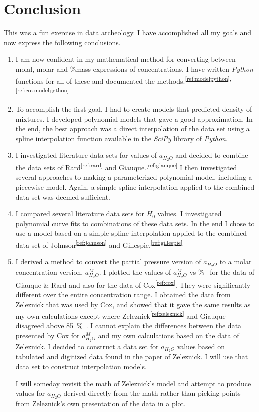 \documentclass[]{tufte-handout}
\newcommand{\tss}[1]{\textsuperscript{#1}}
\begin{document}
\section{Conclusion}

This was a fun exercise in data archeology. I have accomplished all my goals and now express the following conclusions.

\begin{enumerate}

\item I am now confident in my mathematical method for converting between molal, molar and \%mass expressions of concentrations. I have written \textit{Python} functions for all of these and documented the methods.\tss{\ref{ref:modelpython},\ref{ref:coxmodelpython}} 

\item To accomplish the first goal, I had to create models that predicted density of  mixtures. I developed polynomial models that gave a good approximation. In the end, the best approach was a direct interpolation of the data set using a spline interpolation function available in the \textit{SciPy} library of \textit{Python}.

\item I investigated literature data sets for values of $a_{H_2O}$ and decided to combine the data sets of Rard\tss{\ref{ref:rard}} and Giauque.\tss{\ref{ref:giauque}} I then investigated several approaches to making a parameterized polynomial model, including a piecewise model. Again, a simple spline interpolation applied to the combined data set was deemed sufficient.

\item I compared several literature data sets for $H_0$ values. I investigated polynomial curve fits to combinations of these data sets. In the end I chose to use a model based on a simple spline interpolation applied to the combined data set of Johnson\tss{\ref{ref:johnson}} and Gillespie.\tss{\ref{ref:gillespie}}

\item I derived a method to convert the partial pressure version of $a_{H_2O}$ to a molar concentration version, $a_{H_2O}^M$. I plotted the values of $a_{H_2O}^M$ vs \unit{\percent{}} for the data of Giauque \& Rard  and also for the data of Cox\tss{\ref{ref:cox}}. They were significantly different over the entire concentration range. I obtained the data from Zeleznick that was used by Cox, and showed that it gave the same results as my own calculations except where Zeleznick\tss{\ref{ref:zeleznick}} and Giauque disagreed above \qty{85}{\percent{}}. I cannot explain the differences between the data presented by Cox for $a_{H_2O}^M$ and my own calculations based on the data of Zeleznick. I decided to construct a data set for $a_{H_2O}$ values based on tabulated and digitized data found in the paper of Zeleznick. I will use that data set to construct interpolation models.

I will someday revisit the math of Zeleznick's model and attempt to produce values for $a_{H_2O}$ derived directly from the math rather than picking points from Zeleznick's own presentation of the data in a plot.

\end{enumerate}
\end{document}
